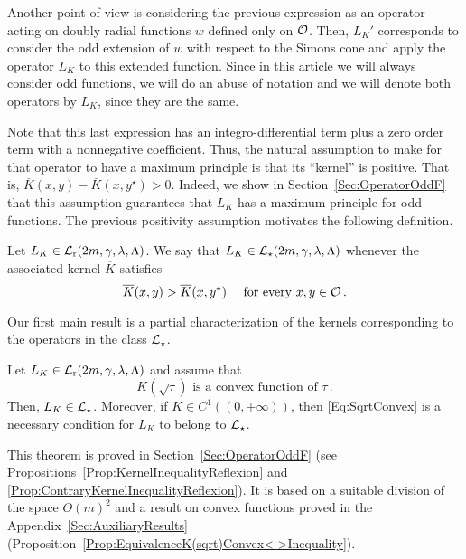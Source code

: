 Another point of view is considering the previous expression as an operator acting on doubly radial functions $w$ defined only on $\mathcal{O}$. Then, $L_K'$ corresponds to consider the odd extension of  $w$ with respect to the Simons cone and apply the operator $L_K$ to this extended function. Since in this article we will always consider odd functions, we will do an abuse of notation and we will denote both operators by $L_K$, since they are the same.

Note that this last expression has an integro-differential term plus a zero order term with a nonnegative coefficient. Thus, the natural assumption to make for that operator to have a maximum principle is that its ``kernel'' is positive. That is, $\overline{K}(x, y) - \overline{K}(x, y^\star)>0$. Indeed, we show in Section~\ref{Sec:OperatorOddF} that this assumption guarantees that $L_K$ has a maximum principle for odd functions. The previous positivity assumption motivates the following definition.

\begin{definition}
	Let $L_K \in \mathcal{L}_{\mathrm{r}}(2m,\gamma,\lambda, \Lambda)$. We say that $L_K\in \mathcal{L}_\star (2m,\gamma,\lambda, \Lambda)$ whenever the associated kernel $\overline{K}$ satisfies
	\begin{equation}
		\label{Eq:KernelInequality}
		\overline{K}(x,y) > \overline{K}(x, y^\star) \quad \text{ for every }x,y \in \mathcal{O}\,.
	\end{equation}
\end{definition}

Our first main result is a partial characterization of the kernels corresponding to the operators in the class $\mathcal{L}_\star$.

\begin{theorem}
	\label{Th:CharacterizationLstar}
	Let $L_K \in \mathcal{L}_{\mathrm{r}}(2m,\gamma,\lambda, \Lambda)$ and assume that 
	\begin{equation}
		\label{Eq:SqrtConvex}	
		K(\sqrt{\tau}) \text{ is a convex function of }\tau\,.
	\end{equation}
	Then, $L_K\in \mathcal{L}_\star$. Moreover, if $K\in C^1((0,+\infty))$, then \eqref{Eq:SqrtConvex} is a necessary condition for $L_K$ to belong to $\mathcal{L}_\star$.
\end{theorem}

This theorem is proved in Section~\ref{Sec:OperatorOddF} (see Propositions~\ref{Prop:KernelInequalityReflexion} and \ref{Prop:ContraryKernelInequalityReflexion}). It is based on a suitable division of the space $O(m)^2$ and a result on convex functions proved in the Appendix~\ref{Sec:AuxiliaryResults} (Proposition~\ref{Prop:EquivalenceK(sqrt)Convex<->Inequality}).



